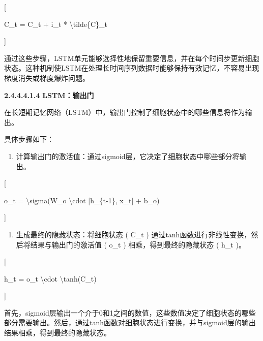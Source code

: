 {[}

C\_t = C\_t + i\_t * \textbackslash tilde\{C\}\_t

{]}


通过这些步骤，LSTM单元能够选择性地保留重要信息，并在每个时间步更新细胞状态。这种机制使LSTM在处理长时间序列数据时能够保持有效记忆，不容易出现梯度消失或梯度爆炸问题。

\textbf{2.4.4.4.1.4} \textbf{LSTM：输出门}

在长短期记忆网络（LSTM）中，输出门控制了细胞状态中的哪些信息将作为输出。


具体步骤如下：

\begin{enumerate}
\def\labelenumi{\arabic{enumi}.}
\item
  计算输出门的激活值：通过sigmoid层，它决定了细胞状态中哪些部分将输出。
\end{enumerate}

{[}

o\_t = \textbackslash sigma(W\_o \textbackslash cdot {[}h\_\{t-1\},
x\_t{]} + b\_o)

{]}


\begin{enumerate}
\def\labelenumi{\arabic{enumi}.}
\item
  生成最终的隐藏状态：将细胞状态 ( C\_t )
  通过tanh函数进行非线性变换，然后将结果与输出门的激活值 ( o\_t )
  相乘，得到最终的隐藏状态 ( h\_t )。
\end{enumerate}

{[}

h\_t = o\_t \textbackslash cdot \textbackslash tanh(C\_t)

{]}


首先，sigmoid层输出一个介于0和1之间的数值，这些数值决定了细胞状态的哪些部分需要输出。然后，通过tanh函数对细胞状态进行变换，并与sigmoid层的输出结果相乘，得到最终的隐藏状态。

